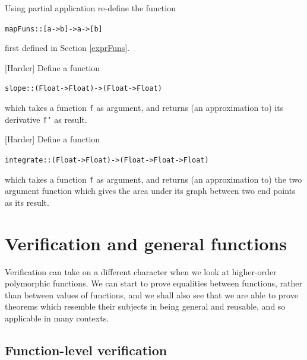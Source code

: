 \begin{exercises}

\item
Using partial application re-define the function 
\begin{alltt}
mapFuns :: [a->b] -> a -> [b]
\end{alltt}
first defined in Section \ref{exprFuns}.


\item
{[Harder]} Define a function
\begin{alltt}
{\hskip1pc}slope :: (Float -> Float) -> (Float -> Float)
\end{alltt}
which takes a function \texttt{f} as argument, and returns (an approximation to)
its derivative \texttt{f'} as result.


\item
{[Harder]} Define a function
\begin{alltt}
{\hskip1pc}integrate :: (Float -> Float) -> (Float -> Float -> Float)
\end{alltt}
which takes a function \texttt{f} as argument, and returns (an approximation to)
the two argument function which gives the area under its graph between two end
points as its result.

\end{exercises}
  





\section[Verification and general functions]{Verification and
general functions}
\label{verifGen}

Verification can take on a different character when we look at higher-order
polymorphic functions. We can start to prove equalities between functions,
rather than between values of functions, and we shall also see that we are able
to prove theorems which resemble their subjects in being general and reusable,
and so applicable in many contexts.

\subsection*{Function-level verification}

